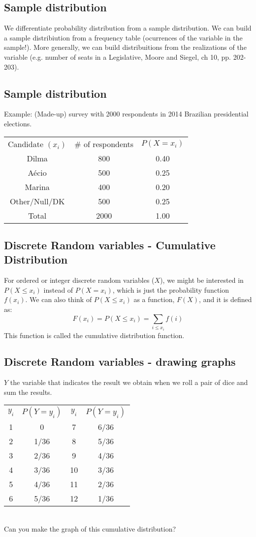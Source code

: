 \documentclass[11pt]{article}
\begin{document}
	\subsection*{Sample distribution}
	We differentiate probability distribution from a sample distribution. We can build a sample distribiution from a frequency table (ocurrences of the variable in the sample!). More generally, we can build distribuitions from the realizations of the variable (e.g. number of seats in a Legislative, Moore and Siegel, ch 10, pp. 202-203).

	\subsection*{Sample distribution}
	Example: (Made-up) survey with 2000 respondents in 2014 Brazilian presidential elections.
	\newline\\
		\begin{tabular}{|c|c|c|}
\hline
	Candidate $(x_i)$ & \# of respondents & $P(X=x_i)$\\
	\cline{1-3}
	Dilma & 800  & 0.40\\
	Aécio &  500 & 0.25\\
	Marina & 400 & 0.20\\
	Other/Null/DK & 500 & 0.25 \\
	\cline{1-3}
	Total & 2000 & 1.00\\
\hline
\end{tabular}
	   
	\subsection*{Discrete Random variables - Cumulative Distribution}
	For ordered or integer discrete random variables ($X$), we might be interested in $P(X \leq x_i)$ instead of $P(X=x_i)$, which is just the probability function $f(x_i)$. We can also think of $P(X \leq x_i)$ as a function, $F(X)$, and it is defined as:
	\[F(x_i) = P(X \leq x_i) =  \sum\limits_{i\leq x_i} f(i)\]
	This function is called the cumulative distribution function.

	\subsection*{Discrete Random variables - drawing graphs}
	$Y$ the variable that indicates the result we obtain when we roll a pair of dice and sum the results.\newline\\
	\begin{tabular}{|c|c|c|c|}
\hline
	$y_i$ & $P(Y=y_i)$ & $y_i$ & $P(Y=y_i)$\\
	\cline{1-4}
	1 & 0 & 7 & 6/36\\
	2 & 1/36 & 8 & 5/36\\
	3 & 2/36 & 9 & 4/36\\
	4 & 3/36 & 10 & 3/36\\
	5 & 4/36 & 11 & 2/36\\
	6 & 5/36 & 12 & 1/36\\
\hline
\end{tabular}
\newline\\
Can you make the graph of this cumulative distribution?
\end{document}
